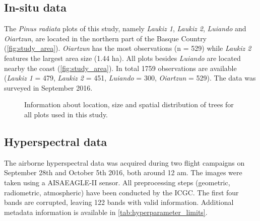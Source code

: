\documentclass[review]{elsarticle}
\begin{document}
\subsection{In-situ data}

\noindent The \textit{Pinus radiata} plots of this study, namely \textit{Laukiz 1}, \textit{Laukiz 2}, \textit{Luiando} and \textit{Oiartzun}, are located in the northern part of the Basque Country (\autoref{fig:study_area}).
\textit{Oiartzun} has the most observations (n = 529) while \textit{Laukiz 2} features the largest area size (1.44 ha).
All plots besides \textit{Luiando} are located nearby the coast (\autoref{fig:study_area}).
In total 1759 observations are available (\textit{Laukiz 1} = 479, \textit{Laukiz 2} = 451, \textit{Luiando} = 300, \textit{Oiartzun} = 529).
The data was surveyed in September 2016.

\begin{figure} [t!]
	\begin{center}
		\caption{Information about location, size and spatial distribution of trees for all plots used in this study.}
		\label{fig:study_area}
	\end{center}
  \end{figure}


\subsection{Hyperspectral data}

\noindent The airborne hyperspectral data was acquired during two flight campaigns on September 28th and October 5th 2016, both around 12 am.
The images were taken using a AISAEAGLE-II sensor.
All preprocessing steps (geometric, radiometric, atmospheric) have been conducted by the \ac{ICGC}.
The first four bands are corrupted, leaving 122 bands with valid information.
Additional metadata information is available in \autoref{tab:hyperparameter_limits}.
\end{document}
